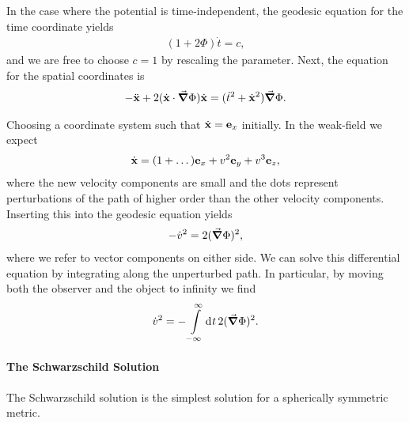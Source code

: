 In the case where the potential is time-independent, the geodesic equation for the time coordinate yields
\begin{align*}
	(1 + 2\Phi)\dot{t} = c,
\end{align*}
and we are free to choose $c = 1$ by rescaling the parameter. Next, the equation for the spatial coordinates is
\begin{align*}
	-\ddot{\vb{x}} + 2(\dot{\vb{x}}\cdot\grad{\Phi})\dot{\vb{x}} = (\dot{t}^{2} + \dot{\vb{x}}^{2})\grad{\Phi}.
\end{align*}

Choosing a coordinate system such that $\dot{\vb{x}} = \vb{e}_{x}$ initially. In the weak-field we expect
\begin{align*}
	\dot{\vb{x}} = (1 + \dots)\vb{e}_{x} + v^{2}\vb{e}_{y} + v^{3}\vb{e}_{z},
\end{align*}
where the new velocity components are small and the dots represent perturbations of the path of higher order than the other velocity components. Inserting this into the geodesic equation yields
\begin{align*}
	-\dot{v}^{2} = 2(\grad{\Phi})^{2},
\end{align*}
where we refer to vector components on either side. We can solve this differential equation by integrating along the unperturbed path. In particular, by moving both the observer and the object to infinity we find
\begin{align*}
	\dot{v}^{2} = -\int\limits_{-\infty}^{\infty}\dd[]{t}2(\grad{\Phi})^{2}.
\end{align*}

\paragraph{The Schwarzschild Solution}
The Schwarzschild solution is the simplest solution for a spherically symmetric metric.

